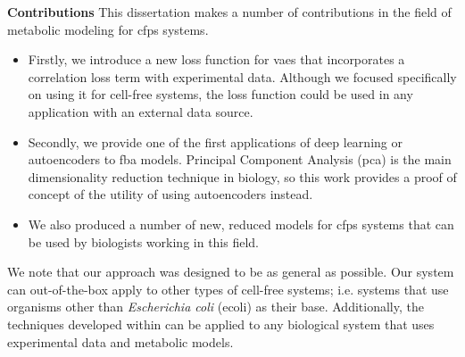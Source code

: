 \textbf{Contributions}
This dissertation makes a number of contributions in the field of metabolic modeling for \gls{cfps} systems.
\begin{itemize}
\item Firstly, we introduce a new loss function for \glspl{vae} that incorporates a correlation loss term with experimental data.
Although we focused specifically on using it for cell-free systems, the loss function could be used in any application with an external data source.
\item Secondly, we provide one of the first applications of deep learning or autoencoders to \gls{fba} models.
Principal Component Analysis (\gls{pca}) is the main dimensionality reduction technique in biology, so this work provides a proof of concept of the utility of using autoencoders instead.
\item We also produced a number of new, reduced models for \gls{cfps} systems that can be used by biologists working in this field.
\end{itemize}
We note that our approach was designed to be as general as possible.
Our system can out-of-the-box apply to other types of cell-free systems; i.e. systems that use organisms other than \textit{Escherichia coli} (\gls{ecoli}) as their base.
Additionally, the techniques developed within can be applied to any biological system that uses experimental data and metabolic models.

